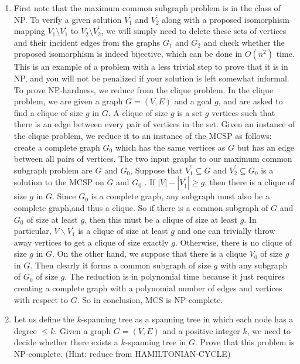 \documentclass[12pt,a4paper]{article}
\makeatletter
\newtheorem*{solution}{Solution}
\theoremstyle{definition}
\renewenvironment{solution}[1][Solution] {\par\pushQED{\qed}\normalfont\topsep6\p@\@plus6\p@\relax\trivlist\item[\hskip\labelsep\bfseries#1\@addpunct{.}]\ignorespaces}{\popQED\endtrivlist\@endpefalse} \makeatother
\makeatother
\begin{document}
\begin{enumerate}
    \begin{solution}
    First note that the maximum common subgraph problem is in the class of NP. To verify a given solution $V_1^'$ and $V_2^'$ along with a proposed isomorphism mapping $V_1 \setminus V_1^'$ to $V_2\setminus V_2^'$, we will simply need to delete these sets of vertices and their incident edges from the graphs $G_1$ and $G_2$ and check
    whether the proposed isomorphism is indeed bijective, which can be done in $O\left(n^2\right)$ time. This is an example
    of a problem with a less trivial step to prove that it is in NP, and you will not be penalized if your solution
    is left somewhat informal.
    To prove NP-hardness, we reduce from the clique problem. In the clique problem, we are given a graph
    $G =\left (V, E\right)$ and a goal $g$, and are asked to find a clique of size $g$ in $G$. A clique of size $g$ is a set $g$ vertices
    such that there is an edge between every pair of vertices in the set. Given an instance of the clique problem,
    we reduce it to an instance of the MCSP as follows: create a complete graph $G_0$ which has the same vertices as
    $G$ but has an edge between all pairs of vertices. The two input graphs to our maximum common subgraph
    problem are $G$ and $G_0$,
    Suppose that $V_1^{'} \subseteq G$ and $V_2^{'} \subseteq G_0$
    is a solution to the MCSP on $G$ and $G_0$
    . If $|V | − |V_1^{'}| \geq g $, then there
    is a clique of size $g$ in $G$. Since $G_0$
    is a complete graph, any subgraph must also be a complete graph,and
    thus a clique. So if there is a common subgraph of $G$ and $G_0$ of size at least $g$, then this must be a clique of
    size at least $g$. In particular, $V \backslash V_1^'$
    is a clique of size at least $g$ and one can trivially throw away vertices to
    get a clique of size exactly $g$. Otherwise, there is no clique of size $g$ in $G$. On the other hand, we suppose that there is
    a clique $V_0$ of size $g$ in $G$. Then clearly it forms a common subgraph of size $g$ with any subgraph of $G_0$ of size
    $g$. The reduction is in polynomial time because it just requires creating a complete graph with a polynomial
    number of edges and vertices with respect to $G$. So in conclusion,  MCS is NP-complete.

    
    
    \end{solution}

    
    \item Let us define the $k$-spanning tree as a spanning tree in which each node has a degree $\leqslant k$. Given a graph $G= (V,E)$ and a positive integer $k$, we need to decide whether there exists a $k$-spanning tree in $G$. Prove that this problem is NP-complete. (Hint: reduce from \textsc{HAMILTONIAN-CYCLE})
    

\end{enumerate}
\end{document}
